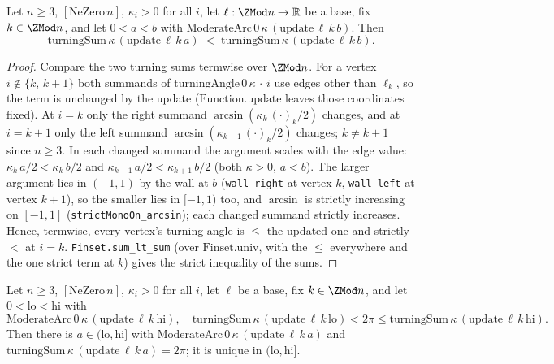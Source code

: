 \begin{lemma}
  \label{lem:turningSum_edge_mono}
  Let $n \ge 3$, $[\mathrm{NeZero}\,n]$, $\kappa_i > 0$ for all $i$, let
  $\ell : \ZMod n \to \mathbb{R}$ be a base, fix $k \in \ZMod n$, and let
  $0 < a < b$ with $\mathrm{ModerateArc}\,0\,\kappa\,(\mathrm{update}\,\ell\,k\,b)$.
  Then
  \[
    \mathrm{turningSum}\,\kappa\,(\mathrm{update}\,\ell\,k\,a)
      \;<\; \mathrm{turningSum}\,\kappa\,(\mathrm{update}\,\ell\,k\,b).
  \]
\end{lemma}

\begin{proof}
  \leanok
  Compare the two turning sums termwise over $\ZMod n$. For a vertex $i \notin
  \{k,\,k+1\}$ both summands of $\mathrm{turningAngle}\,0\,\kappa\,\cdot\,i$ use
  edges other than $\ell_k$, so the term is unchanged by the update
  ($\mathrm{Function.update}$ leaves those coordinates fixed). At $i = k$ only the
  right summand $\arcsin(\kappa_k\,(\cdot)_k/2)$ changes, and at $i = k+1$ only the
  left summand $\arcsin(\kappa_{k+1}\,(\cdot)_k/2)$ changes; $k \ne k+1$ since
  $n \ge 3$. In each changed summand the argument scales with the edge value:
  $\kappa_k\,a/2 < \kappa_k\,b/2$ and $\kappa_{k+1}\,a/2 < \kappa_{k+1}\,b/2$
  (both $\kappa > 0$, $a < b$). The larger argument lies in $(-1,1)$ by the wall
  at $b$ (\texttt{wall\_right} at vertex $k$, \texttt{wall\_left} at vertex
  $k+1$), so the smaller lies in $[-1,1)$ too, and $\arcsin$ is strictly
  increasing on $[-1,1]$ (\texttt{strictMonoOn\_arcsin}); each changed summand
  strictly increases. Hence, termwise, every vertex's turning angle is $\le$ the
  updated one and strictly $<$ at $i = k$. \texttt{Finset.sum\_lt\_sum} (over
  $\mathrm{Finset.univ}$, with the $\le$ everywhere and the one strict term at
  $k$) gives the strict inequality of the sums.
\end{proof}

\begin{lemma}
  \label{lem:exists_edge_turning_scale}
  Let $n \ge 3$, $[\mathrm{NeZero}\,n]$, $\kappa_i > 0$ for all $i$, let $\ell$ be
  a base, fix $k \in \ZMod n$, and let $0 < \mathrm{lo} < \mathrm{hi}$ with
  \[
    \mathrm{ModerateArc}\,0\,\kappa\,(\mathrm{update}\,\ell\,k\,\mathrm{hi}),
    \quad
    \mathrm{turningSum}\,\kappa\,(\mathrm{update}\,\ell\,k\,\mathrm{lo}) < 2\pi
    \le \mathrm{turningSum}\,\kappa\,(\mathrm{update}\,\ell\,k\,\mathrm{hi}).
  \]
  Then there is $a \in (\mathrm{lo}, \mathrm{hi}]$ with
  $\mathrm{ModerateArc}\,0\,\kappa\,(\mathrm{update}\,\ell\,k\,a)$ and
  $\mathrm{turningSum}\,\kappa\,(\mathrm{update}\,\ell\,k\,a) = 2\pi$; it is
  unique in $(\mathrm{lo},\mathrm{hi}]$.
\end{lemma}

